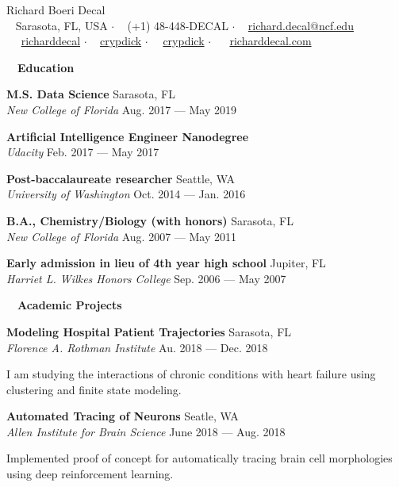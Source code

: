\documentclass[a4paper,12pt]{article}
\newcommand{\resheading}[1]{{\hspace{-9pt} \colorbox{mygrey}{\begin{minipage}{\textwidth}{\textmd{~~\large \textbf{#1} \vphantom{p\^{E}}}}\end{minipage}}\vspace{6pt}} }
\newcommand{\ressubheading}[4]{{\begin{minipage}{\textwidth}
        \textbf{#1} \hfill #2 \\
        \textit{#3} \hfill #4 \\
        \end{minipage}}}
\begin{document}
\begin{center}
{\Huge Richard Boeri Decal} \\
{\small \faMapMarker~ Sarasota, FL, USA $\cdot$ \faPhone~ (+1) 48-448-DECAL $\cdot$ \faEnvelope~ \href{mailto:richard.decal@ncf.edu}{richard.decal@ncf.edu}  \\ ~\faLinkedin~ \href{https://www.linkedin.com/in/richarddecal/}{richarddecal} $\cdot$ \faGithubAlt~ \href{https://github.com/crypdick}{crypdick}   $\cdot$~\faStackOverflow~  \href{https://stackoverflow.com/users/4212158/crypdick}{crypdick} $\cdot$  ~\faHome~  \href{http://www.richarddecal.com}{richarddecal.com}} %
\end{center}



\resheading{Education}

    \ressubheading{M.S. Data Science}{Sarasota, FL}{New College of Florida}{Aug. 2017 --- May 2019}

    \ressubheading{Artificial Intelligence Engineer Nanodegree}{}{Udacity}{Feb. 2017 --- May 2017}

    \ressubheading{Post-baccalaureate researcher}{Seattle, WA}{University of Washington}{Oct. 2014 --- Jan. 2016}
 
    \ressubheading{B.A., Chemistry/Biology (with honors)}{Sarasota, FL}{New College of Florida}{Aug. 2007 --- May 2011}

    \ressubheading{Early admission in lieu of 4th year high school}{Jupiter, FL}{Harriet L. Wilkes Honors College}{Sep. 2006 --- May 2007}


\resheading{Academic Projects}


\ressubheading{Modeling Hospital Patient Trajectories}{Sarasota, FL}{Florence A. Rothman Institute}{Au. 2018 --- Dec. 2018}

\vspace{-6pt} I am studying the interactions of chronic conditions with heart failure using clustering and finite state modeling.\\

\ressubheading{Automated Tracing of Neurons}{Seatle, WA}{Allen Institute for Brain Science}{June 2018 --- Aug. 2018}

\vspace{-6pt} Implemented proof of concept for automatically tracing brain cell morphologies using deep reinforcement learning.\\ %
\end{document}
